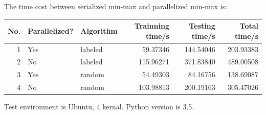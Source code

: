 \documentclass[11pt]{article}
\begin{document}
The time cost between serialized min-max and parallelized min-max is:

\begin{center}
\begin{tabular}{rllrrr}
\hline
No. & Parallelized? & Algorithm & Trainning time/s & Testing time/s & Total time/s\\
\hline
1 & Yes & labeled & 59.37346 & 144.54046 & 203.93383\\
2 & No & labeled & 115.96271 & 371.83840 & 489.00508\\
3 & Yes & random & 54.49303 & 84.16756 & 138.69087\\
4 & No & random & 103.98813 & 200.19163 & 305.47026\\
\hline
\end{tabular}
\end{center}


Test environment is Ubuntu, 4 kernal.
Python version is 3.5.
\end{document}
